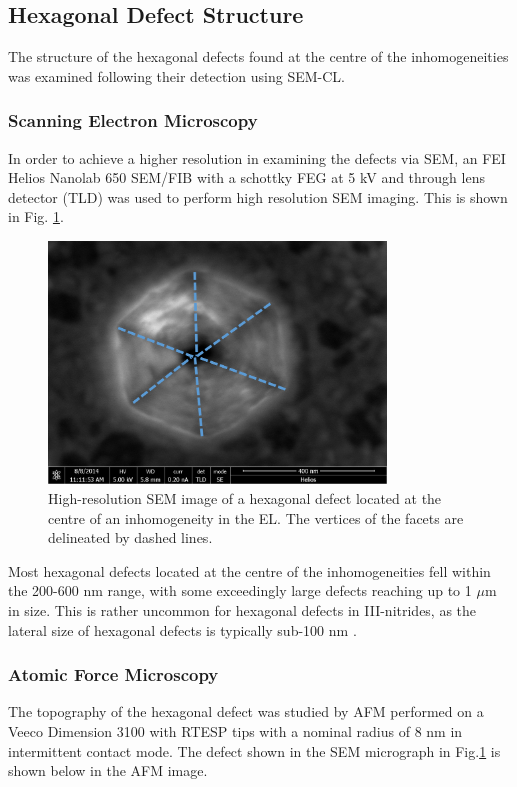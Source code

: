 \FloatBarrier

\subsection{Hexagonal Defect Structure}

The structure of the hexagonal defects found at the centre of the inhomogeneities was examined following their detection using SEM-CL. 

\subsubsection{Scanning Electron Microscopy}
In order to achieve a higher resolution in examining the defects via SEM, an FEI Helios Nanolab 650 SEM/FIB with a schottky FEG at 5 kV and through lens detector (TLD) was used to perform high resolution SEM imaging. This is shown in Fig. \ref{sem-pit}.

\begin{figure}[!ht]
	\centering
	\includegraphics[width=0.8\textwidth]{Figs/Ch3/sem-pit.png}
	\caption[h] {High-resolution SEM image of a hexagonal defect located at the centre of an inhomogeneity in the EL. The vertices of the facets are delineated by dashed lines.}
	\label{sem-pit}
\end{figure}
\FloatBarrier 

Most hexagonal defects located at the centre of the inhomogeneities fell within the 200-600 nm range, with some exceedingly large defects reaching up to 1 $\mu$m in size. This is rather uncommon for hexagonal defects in III-nitrides, as the lateral size of hexagonal defects is typically sub-100 nm \cite{Oliver2006a,Tsai2007}.

\subsubsection{Atomic Force Microscopy}
The topography of the hexagonal defect was studied by AFM performed on a Veeco Dimension 3100 with RTESP tips with a nominal radius of 8 nm in intermittent contact mode. The defect shown in the SEM micrograph in Fig.\ref{sem-pit} is shown below in the AFM image.

